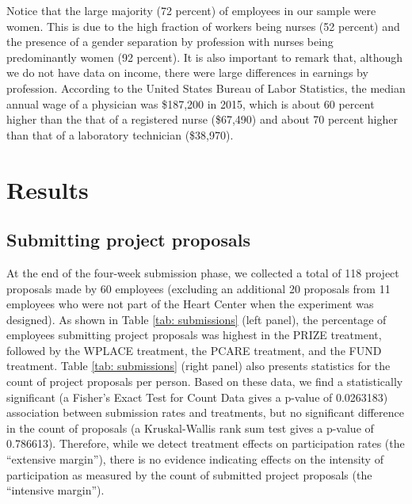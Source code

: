 \documentclass[11pt, titlepage]{article}
\begin{document}
Notice that the large majority (72 percent) of employees in our sample
were women. This is due to the high fraction of workers being nurses (52
percent) and the presence of a gender separation by profession with
nurses being predominantly women (92 percent). It is also important to
remark that, although we do not have data on income, there were large
differences in earnings by profession. According to the United States
Bureau of Labor Statistics, the median annual wage of a physician was
\$187,200 in 2015, which is about 60 percent higher than the that of a
registered nurse (\$67,490) and about 70 percent higher than that of a
laboratory technician (\$38,970).

\section{Results}\label{results}

\subsection{Submitting project
proposals}\label{submitting-project-proposals}

At the end of the four-week submission phase, we collected a total of
118 project proposals made by 60 employees (excluding an additional 20
proposals from 11 employees who were not part of the Heart Center when
the experiment was designed). As shown in Table \ref{tab: submissions}
(left panel), the percentage of employees submitting project proposals
was highest in the PRIZE treatment, followed by the WPLACE treatment,
the PCARE treatment, and the FUND treatment. Table
\ref{tab: submissions} (right panel) also presents statistics for the
count of project proposals per person. Based on these data, we find a
statistically significant (a Fisher's Exact Test for Count Data gives a
p-value of 0.0263183) association between submission rates and
treatments, but no significant difference in the count of proposals (a
Kruskal-Wallis rank sum test gives a p-value of 0.786613). Therefore,
while we detect treatment effects on participation rates (the
``extensive margin''), there is no evidence indicating effects on the
intensity of participation as measured by the count of submitted project
proposals (the ``intensive margin'').
\end{document}
